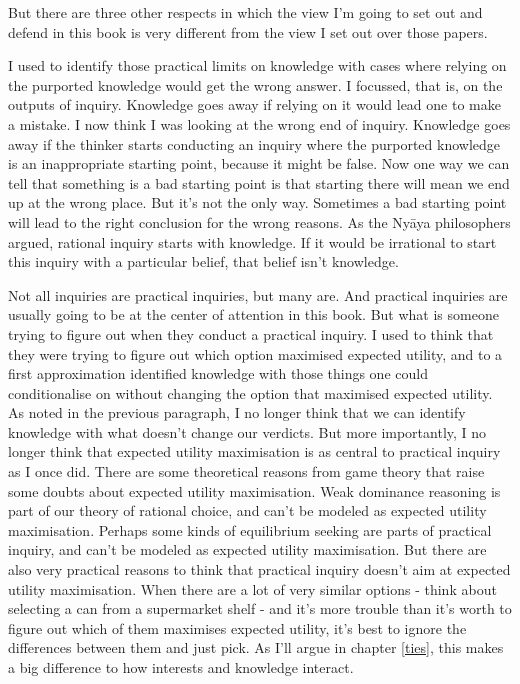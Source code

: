 \documentclass[
  11pt,
]{book}
\begin{document}
But there are three other respects in which the view I'm going to set out and defend in this book is very different from the view I set out over those papers.

I used to identify those practical limits on knowledge with cases where relying on the purported knowledge would get the wrong answer. I focussed, that is, on the outputs of inquiry. Knowledge goes away if relying on it would lead one to make a mistake. I now think I was looking at the wrong end of inquiry. Knowledge goes away if the thinker starts conducting an inquiry where the purported knowledge is an inappropriate starting point, because it might be false. Now one way we can tell that something is a bad starting point is that starting there will mean we end up at the wrong place. But it's not the only way. Sometimes a bad starting point will lead to the right conclusion for the wrong reasons. As the Nyāya philosophers argued, rational inquiry starts with knowledge. If it would be irrational to start this inquiry with a particular belief, that belief isn't knowledge.

Not all inquiries are practical inquiries, but many are. And practical inquiries are usually going to be at the center of attention in this book. But what is someone trying to figure out when they conduct a practical inquiry. I used to think that they were trying to figure out which option maximised expected utility, and to a first approximation identified knowledge with those things one could conditionalise on without changing the option that maximised expected utility. As noted in the previous paragraph, I no longer think that we can identify knowledge with what doesn't change our verdicts. But more importantly, I no longer think that expected utility maximisation is as central to practical inquiry as I once did. There are some theoretical reasons from game theory that raise some doubts about expected utility maximisation. Weak dominance reasoning is part of our theory of rational choice, and can't be modeled as expected utility maximisation. Perhaps some kinds of equilibrium seeking are parts of practical inquiry, and can't be modeled as expected utility maximisation. But there are also very practical reasons to think that practical inquiry doesn't aim at expected utility maximisation. When there are a lot of very similar options - think about selecting a can from a supermarket shelf - and it's more trouble than it's worth to figure out which of them maximises expected utility, it's best to ignore the differences between them and just pick. As I'll argue in chapter \ref{ties}, this makes a big difference to how interests and knowledge interact.
\end{document}
